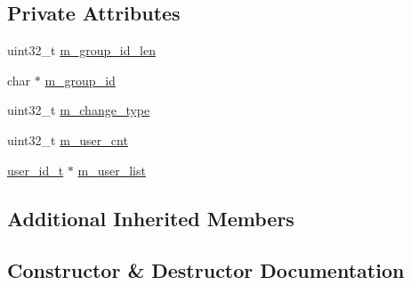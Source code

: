 \subsection*{Private Attributes}
\begin{DoxyCompactItemize}
\item 
uint32\+\_\+t \hyperlink{class_c_im_pdu_client_group_change_member_request_a90423832c1edc34b5f5f1366ad694052}{m\+\_\+group\+\_\+id\+\_\+len}
\item 
char $\ast$ \hyperlink{class_c_im_pdu_client_group_change_member_request_a439cbb36c070f02dace9ef38db3331b4}{m\+\_\+group\+\_\+id}
\item 
uint32\+\_\+t \hyperlink{class_c_im_pdu_client_group_change_member_request_a03550182ebc05008e2280e2d76472e06}{m\+\_\+change\+\_\+type}
\item 
uint32\+\_\+t \hyperlink{class_c_im_pdu_client_group_change_member_request_a2c1f5a8256d1e601ccb8f688f0b46997}{m\+\_\+user\+\_\+cnt}
\item 
\hyperlink{structuser__id__t}{user\+\_\+id\+\_\+t} $\ast$ \hyperlink{class_c_im_pdu_client_group_change_member_request_a3ab5c3e3ed6c76c17fa4da3fa95cfddf}{m\+\_\+user\+\_\+list}
\end{DoxyCompactItemize}
\subsection*{Additional Inherited Members}


\subsection{Constructor \& Destructor Documentation}
\hypertarget{class_c_im_pdu_client_group_change_member_request_a09f7b11d0dc77667c01a5454fa9bd265}{}
